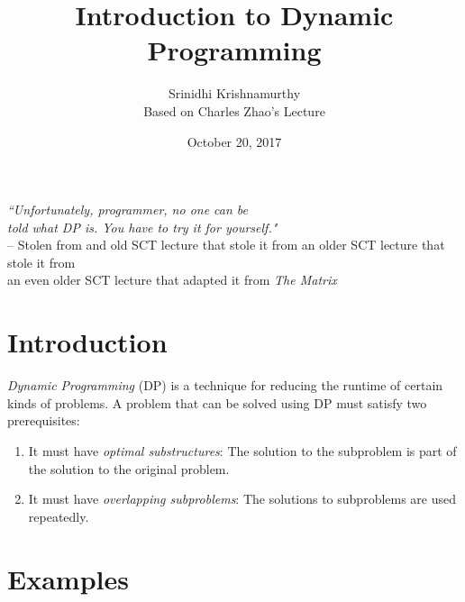 \documentclass[11pt]{article}
\title{Introduction to Dynamic Programming}
\author{Srinidhi Krishnamurthy \\Based on Charles Zhao's Lecture}
\date{October 20, 2017}
\begin{document}
\maketitle


\begin{center}
    \textit{``Unfortunately, programmer, no one can be\\ told what DP is.
You have to try it for yourself."}\\
    \medskip
    -- Stolen from and old SCT lecture that stole it from an older SCT lecture that stole it from\\ an even older SCT lecture that adapted it from \textit{The Matrix}
\end{center}


\section{Introduction}
\textit{Dynamic Programming} (DP) is a technique for reducing the runtime of certain kinds of problems. A problem that can be solved using DP must satisfy two prerequisites:
\begin{enumerate}
    \item It must have \textit{optimal substructures}: The solution to the subproblem is part of the solution to the original problem.
\item It must have \textit{overlapping subproblems}: The solutions to subproblems are used repeatedly.
\end{enumerate}


\section{Examples}
\end{document}
